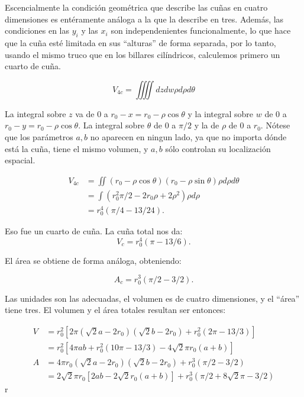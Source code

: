 \documentclass[letterpaperr,12pt]{article}
\begin{document}
Escencialmente la condición geométrica que describe
las cuñas en cuatro dimensiones es entéramente análoga
a la que la describe en tres. Además, las condiciones
en las $y_i$ y las $x_i$ son independenientes funcionalmente,
lo que hace que la cuña esté limitada en sus ``alturas'' 
de forma separada, por lo tanto, usando el mismo truco que en 
los billares cilíndricos, calculemos primero un cuarto de cuña.

\begin{equation}
V_{4c}=\iiiint dz dw \rho d \rho d \theta
\end{equation}

La integral sobre $z$ va de 0 a $r_0-x=r_0-\rho \cos \theta$ y 
la integral sobre $w$ de 0 a $r_0-y=r_0-\rho \cos \theta$.
La integral sobre $\theta$ de 0 a $\pi/2$ y 
la de $\rho$ de 0 a $r_0$.
Nótese que los parámetros $a,b$ no aparecen en ningun lado, 
ya que no importa dónde está la cuña, tiene el mismo volumen,
y $a,b $ sólo controlan su localización espacial. 

\begin{align}
V_{4c} & =\iint (r_0-\rho \cos \theta)(r_0 - \rho \sin \theta)
 \rho d \rho d \theta \\
&=\int (r_0^2 \pi/2 -2 r_0 \rho +2 \rho^2) \rho d \rho \\
&= r_0^4 (\pi/4-13/24).
\end{align}

Eso fue un cuarto de cuña. La cuña total nos da:
\begin{equation}
V_c= r_0^4 (\pi-13/6).
\end{equation}

El área se obtiene de forma análoga, obteniendo:

\begin{equation}
A_c= r_0^3 (\pi/2-3/2).
\end{equation}

Las unidades son las adecuadas, el volumen es de cuatro
dimensiones, y el ``área'' tiene tres.
El volumen y el área totales resultan ser entonces:

\begin{align}
 V & = r_0^2 [2 \pi  (\sqrt{2}a-2 r_0) (\sqrt{2}b-2 r_0) + r_0^2 (2\pi-13/3)] \\
 & = r_0^2 [4 \pi ab   + r_0^2 (10\pi-13/3)-4 \sqrt{2} \pi r_0 (a+b)] \\
A & = 4\pi r_0 (\sqrt{2}a-2 r_0) (\sqrt{2}b-2 r_0) +  r_0^3 (\pi/2-3/2) \\
 & = 2 \sqrt{2} \pi r_0 [2 ab -2\sqrt{2} r_0 (a+b)] +  r_0^3 (\pi/2+8\sqrt{2}\pi-3/2) 
\end{align}r
\end{document}
